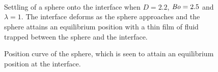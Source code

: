 \documentclass[12pt]{article}
\newcommand\Bo{\mbox{\textit{Bo}}}  %
\begin{document}
    \begin{figure}
      \centering
      \begin{subfigure}[b]{0.45\textwidth}
        \resizebox{\textwidth}{!}{\Large }
        \caption{}
        \label{fig:floating_frame2}
      \end{subfigure}
      ~
      \begin{subfigure}[b]{0.45\textwidth}
        \resizebox{\textwidth}{!}{\Large }
        \caption{}
        \label{fig:floating_frame3}
      \end{subfigure}
      
      \begin{subfigure}[b]{0.45\textwidth}
        \resizebox{\textwidth}{!}{\Large }
        \caption{}
        \label{fig:floating_frame4}
      \end{subfigure}
      ~
      \begin{subfigure}[b]{0.45\textwidth}
        \resizebox{\textwidth}{!}{\Large }
        \caption{}
        \label{fig:floating_frame5}
      \end{subfigure}
      
      \begin{subfigure}[b]{0.45\textwidth}
        \resizebox{\textwidth}{!}{\Large }
        \caption{}
        \label{fig:floating_frame6}
      \end{subfigure}
      ~
      \begin{subfigure}[b]{0.45\textwidth}
        \resizebox{\textwidth}{!}{\Large }
        \caption{}
        \label{fig:floating_frame7}
      \end{subfigure}
      \caption{Settling of a sphere onto the interface when $D = 2.2$, $\Bo = 2.5$ and $\lambda = 1$. The interface deforms as the sphere approaches and the sphere attains an equilibrium position with a thin film of fluid trapped between the sphere and the interface.}\label{fig:floating_frame}
    \end{figure}

  \begin{figure}
    \resizebox{0.9\textwidth}{!}{\large }
    \caption{Position curve of the sphere, which is seen to attain an equilibrium position at the interface. \label{fig:floating_traj}}
  \end{figure}
\end{document}
